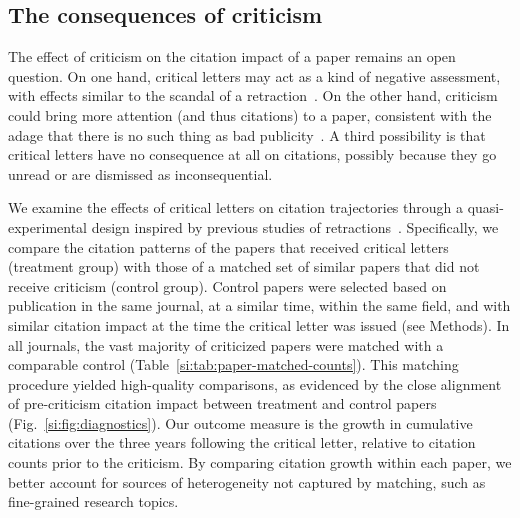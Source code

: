 \documentclass[12pt,a4paper]{article}
\numberwithin{equation}{section}
\def\methods{Methods}
\begin{document}
\subsection*{The consequences of criticism}
The effect of criticism on the citation impact of a paper remains an open question. 
On one hand, critical letters may act as a kind of negative assessment, with effects similar to the scandal of a retraction~\cite{peng2022retracted,azoulay_2015_retractions}.
On the other hand, criticism could bring more attention (and thus citations) to a paper, consistent with the adage that there is no such thing as bad publicity~\cite{radicchi_2012_comment,berger_2010_publicity}.
A third possibility is that critical letters have no consequence at all on citations, possibly because they go unread or are dismissed as inconsequential. 

We examine the effects of critical letters on citation trajectories through a quasi-experimental design inspired by previous studies of retractions~\cite{peng2022retracted}.
Specifically, we compare the citation patterns of the papers that received critical letters (treatment group) with those of a matched set of similar papers that did not receive criticism (control group).
Control papers were selected based on publication in the same journal, at a similar time, within the same field, and with similar citation impact at the time the critical letter was issued (see \methods).
In all journals, the vast majority of criticized papers were matched with a comparable control (Table~\ref*{si:tab:paper-matched-counts}). 
This matching procedure yielded high-quality comparisons, as evidenced by the close alignment of pre-criticism citation impact between treatment and control papers (Fig.~\ref*{si:fig:diagnostics}).
Our outcome measure is the growth in cumulative citations over the three years following the critical letter, relative to citation counts prior to the criticism. 
By comparing citation growth within each paper, we better account for sources of heterogeneity not captured by matching, such as fine-grained research topics.
\end{document}
